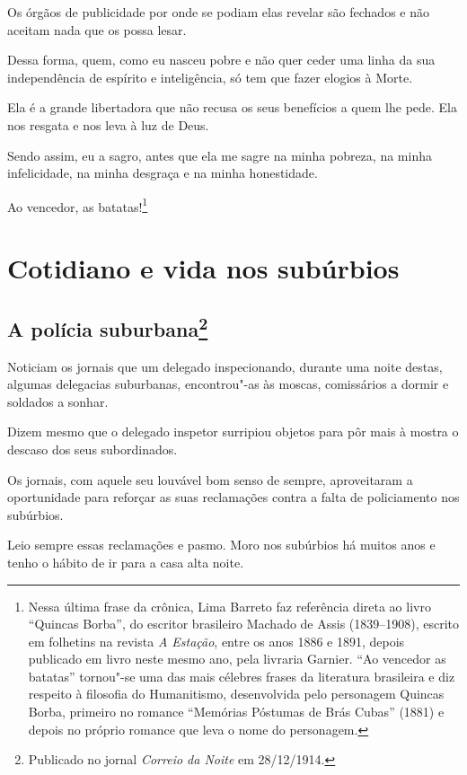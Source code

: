 Os órgãos de publicidade por onde se podiam elas revelar são fechados e
não aceitam nada que os possa lesar.

Dessa forma, quem, como eu nasceu pobre e não quer ceder uma linha da
sua independência de espírito e inteligência, só tem que fazer elogios à
Morte.

Ela é a grande libertadora que não recusa os seus benefícios a quem lhe
pede. Ela nos resgata e nos leva à luz de Deus.

Sendo assim, eu a sagro, antes que ela me sagre na minha pobreza, na
minha infelicidade, na minha desgraça e na minha honestidade.

Ao vencedor, as batatas!\footnote{Nessa última frase da crônica, Lima
  Barreto faz referência direta ao livro ``Quincas Borba'', do escritor
  brasileiro Machado de Assis (1839--1908), escrito em folhetins na
  revista \emph{A Estação}, entre os anos 1886 e 1891, depois publicado
  em livro neste mesmo ano, pela livraria Garnier. ``Ao vencedor as
  batatas'' tornou"-se uma das mais célebres frases da literatura
  brasileira e diz respeito à filosofia do Humanitismo, desenvolvida
  pelo personagem Quincas Borba, primeiro no romance ``Memórias Póstumas
  de Brás Cubas'' (1881) e depois no próprio romance que leva o nome do
  personagem.}

\part{Cotidiano e vida nos subúrbios}

\chapter[A polícia suburbana]{A polícia suburbana\footnote[*]{Publicado no jornal \emph{Correio da Noite} em 28/12/1914.}}

Noticiam os jornais que um delegado inspecionando, durante uma noite
destas, algumas delegacias suburbanas, encontrou"-as às moscas,
comissários a dormir e soldados a sonhar.

Dizem mesmo que o delegado inspetor surripiou objetos para pôr mais à
mostra o descaso dos seus subordinados.

Os jornais, com aquele seu louvável bom senso de sempre, aproveitaram a
oportunidade para reforçar as suas reclamações contra a falta de
policiamento nos subúrbios.

Leio sempre essas reclamações e pasmo. Moro nos subúrbios há muitos anos
e tenho o hábito de ir para a casa alta noite.


